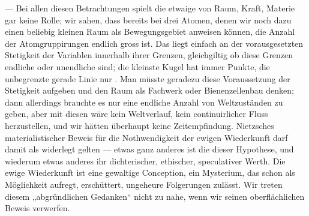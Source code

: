 — Bei allen diesen Betrachtungen spielt die etwaige  von Raum, Kraft, Materie gar keine Rolle; wir sahen, dass bereits bei drei Atomen, denen wir noch dazu einen beliebig kleinen Raum als Bewegungsgebiet anweisen können, die Anzahl der Atomgruppirungen endlich gross ist. Das liegt einfach an der vorausgesetzten Stetigkeit der Variablen innerhalb ihrer Grenzen, gleichgiltig ob diese Grenzen endliche oder unendliche sind; die kleinste Kugel hat immer  Punkte, die unbegrenzte gerade Linie nur \Math{\infty}. Man müsste geradezu diese Voraussetzung der Stetigkeit aufgeben und den Raum als Fachwerk oder Bienenzellenbau denken; dann allerdings brauchte es nur eine endliche Anzahl von Weltzuständen zu geben, aber mit diesen wäre kein Weltverlauf, kein continuirlicher Fluss herzustellen, und wir hätten überhaupt keine Zeitempfindung. Nietzsches materialistischer Beweis für die Nothwendigkeit der ewigen Wiederkunft darf damit als widerlegt gelten — etwas ganz anderes ist die  dieser Hypothese, und wiederum etwas anderes ihr dichterischer, ethischer, speculativer Werth. Die ewige Wiederkunft ist eine gewaltige Conception, ein Mysterium, das schon als Möglichkeit aufregt, erschüttert, ungeheure Folgerungen zulässt. Wir treten diesem „abgründlichen Gedanken“ nicht zu nahe, wenn wir seinen oberflächlichen Beweis verwerfen.
\par

